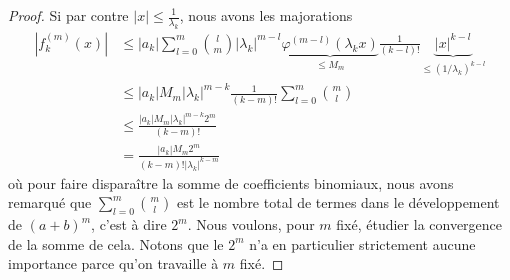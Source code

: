 \begin{proof}
    Si par contre \( | x |\leq\frac{1}{ \lambda_k }\), nous avons les majorations
    \begin{subequations}
        \begin{align}
        | f^{(m)}_k(x) |&\leq  |a_k|\sum_{l=0}^{m}\binom{ l }{ m }|\lambda_k|^{m-l}\underbrace{\varphi^{(m-l)}(\lambda_kx)}_{\leq M_m}\frac{ 1 }{ (k-l)! }\underbrace{| x |^{k-l}}_{\leq (1/\lambda_k)^{k-l}}\\
        &\leq | a_k |M_m| \lambda_k |^{m-k}\frac{1}{ (k-m)! }\sum_{l=0}^{m}\binom{ m }{ l }\\
        &\leq \frac{ | a_k |M_m | \lambda_k |^{m-k}2^m }{ (k-m)! }\\
        &= \frac{ | a_k |M_m 2^m }{ (k-m)!  | \lambda_k |^{k-m} }       \label{EqQSPUaun}
        \end{align}
    \end{subequations}
    où pour faire disparaître la somme de coefficients binomiaux, nous avons remarqué que \( \sum_{l=0}^m\binom{ m }{ l }\) est le nombre total de termes dans le développement de \( (a+b)^m\), c'est à dire \( 2^m\). Nous voulons, pour \( m\) fixé, étudier la convergence de la somme de cela. Notons que le \( 2^m\) n'a en particulier strictement aucune importance parce qu'on travaille à \( m\) fixé.


\end{proof}
